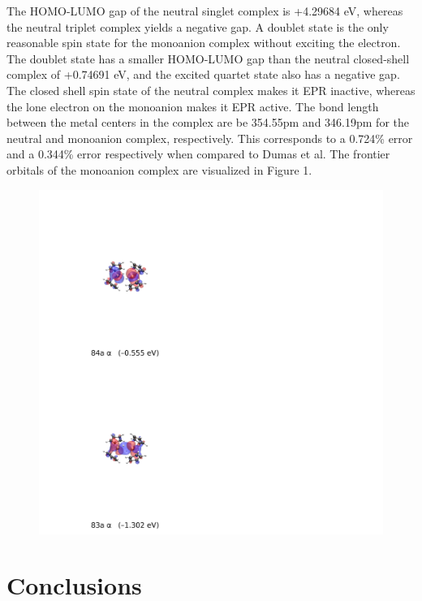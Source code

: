 \documentclass{article}
\begin{document}
The HOMO-LUMO gap of the neutral singlet complex is +4.29684 eV, whereas the
neutral triplet complex yields a negative gap. A doublet state is the only
reasonable spin state for the monoanion complex without exciting the electron.
The doublet state has a smaller HOMO-LUMO gap than the neutral closed-shell
complex of +0.74691 eV, and the excited quartet state also has a negative gap.
The closed shell spin state of the neutral complex makes it EPR inactive,
whereas the lone electron on the monoanion makes it EPR active. The bond length
between the metal centers in the complex are be 354.55pm and 346.19pm for the
neutral and monoanion complex, respectively. This corresponds to a 0.724\%
error and a 0.344\% error respectively when compared to Dumas et al.
\cite{dumas} The frontier orbitals of the monoanion complex are visualized in
Figure 1.  

\begin{figure}[h]
	\centering
	\includegraphics[width=\textwidth]{../images/lanthanide/merged.jpg}
\end{figure}


\section{Conclusions} %
\end{document}

